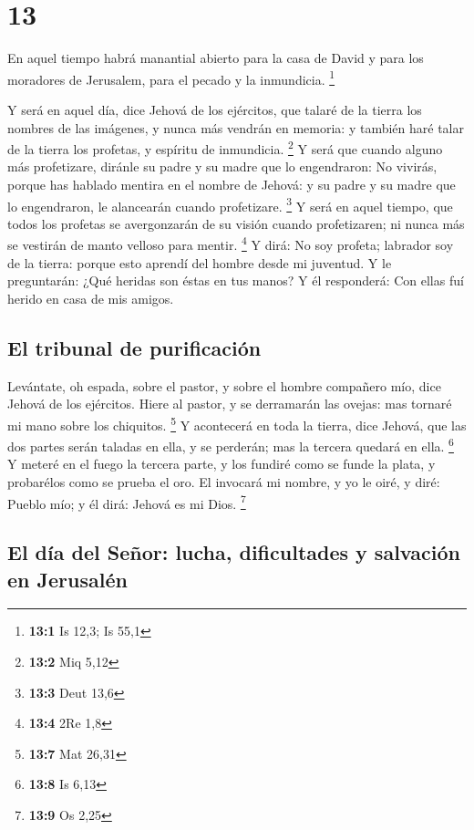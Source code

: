 \hypertarget{section-12}{%
\section{13}\label{section-12}}

 En aquel tiempo habrá manantial abierto para la casa de
David y para los moradores de Jerusalem, para el pecado y la inmundicia.
\footnote{\textbf{13:1} Is 12,3; Is 55,1}

 Y será en aquel día, dice Jehová de los ejércitos, que
talaré de la tierra los nombres de las imágenes, y nunca más vendrán en
memoria: y también haré talar de la tierra los profetas, y espíritu de
inmundicia. \footnote{\textbf{13:2} Miq 5,12}  Y será que
cuando alguno más profetizare, diránle su padre y su madre que lo
engendraron: No vivirás, porque has hablado mentira en el nombre de
Jehová: y su padre y su madre que lo engendraron, le alancearán cuando
profetizare. \footnote{\textbf{13:3} Deut 13,6}  Y será en
aquel tiempo, que todos los profetas se avergonzarán de su visión cuando
profetizaren; ni nunca más se vestirán de manto velloso para mentir.
\footnote{\textbf{13:4} 2Re 1,8}  Y dirá: No soy profeta;
labrador soy de la tierra: porque esto aprendí del hombre desde mi
juventud.  Y le preguntarán: ¿Qué heridas son éstas en tus
manos? Y él responderá: Con ellas fuí herido en casa de mis amigos.

\hypertarget{el-tribunal-de-purificaciuxf3n}{%
\subsection{El tribunal de
purificación}\label{el-tribunal-de-purificaciuxf3n}}

 Levántate, oh espada, sobre el pastor, y sobre el hombre
compañero mío, dice Jehová de los ejércitos. Hiere al pastor, y se
derramarán las ovejas: mas tornaré mi mano sobre los chiquitos.
\footnote{\textbf{13:7} Mat 26,31}  Y acontecerá en toda
la tierra, dice Jehová, que las dos partes serán taladas en ella, y se
perderán; mas la tercera quedará en ella. \footnote{\textbf{13:8} Is
  6,13}  Y meteré en el fuego la tercera parte, y los
fundiré como se funde la plata, y probarélos como se prueba el oro. El
invocará mi nombre, y yo le oiré, y diré: Pueblo mío; y él dirá: Jehová
es mi Dios. \footnote{\textbf{13:9} Os 2,25}

\hypertarget{el-duxeda-del-seuxf1or-lucha-dificultades-y-salvaciuxf3n-en-jerusaluxe9n}{%
\subsection{El día del Señor: lucha, dificultades y salvación en
Jerusalén}\label{el-duxeda-del-seuxf1or-lucha-dificultades-y-salvaciuxf3n-en-jerusaluxe9n}}

